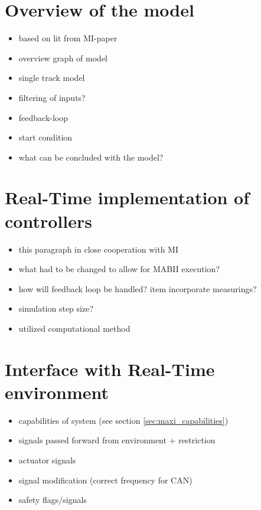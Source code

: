 \documentclass[ExampleMasters.tex]{subfiles}
\begin{document}
\section{Overview of the model}
\label{sec:overview_of_the_model}
			
\begin{itemize}
	\item based on lit from MI-paper 
	\item overview graph of model
	\item single track model
	
	\item filtering of inputs?
	\item feedback-loop
	\item start condition
	\item what can be concluded with the model?
\end{itemize}



\section{Real-Time implementation of controllers}
\label{sec:real_time_implementation}

\begin{itemize}
	\item this paragraph in close cooperation with MI
	\item what had to be changed to allow for MABII execution?
	\item how will feedback loop be handled?
	item incorporate measurings?
	\item simulation step size?
	\item utilized computational method
\end{itemize}

\section{Interface with Real-Time environment}
\label{sec:interface_with_real_time}

\begin{itemize}
	\item capabilities of system (see section \ref{sec:maxi_capabilities})
	\item signals passed forward from environment + restriction
	
	\item actuator signals
	\item signal modification (correct frequency for CAN)
	\item safety flags/signals
	
\end{itemize}
\end{document}
